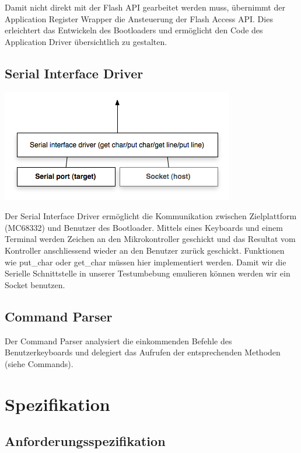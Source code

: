 \documentclass[letterpaper,10pt,ngerman]{manual}
\begin{document}
Damit nicht direkt mit der Flash API gearbeitet werden muss, übernimmt der
Application Register Wrapper die Ansteuerung der Flash Access API. Dies
erleichtert das Entwickeln des Bootloaders und ermöglicht den Code des
Application Driver übersichtlich zu gestalten.


\section{Serial Interface Driver}

\includegraphics{serial-driver.png}

Der Serial Interface Driver ermöglicht die Kommunikation zwischen Zielplattform (MC68332)
und Benutzer des Bootloader. Mittels eines Keyboards und einem Terminal werden
Zeichen an den Mikrokontroller geschickt und das Resultat vom Kontroller
anschliessend wieder an den Benutzer zurück geschickt. Funktionen wie
put\_char oder get\_char müssen hier implementiert werden.
Damit wir die Serielle Schnittstelle in unserer Testumbebung emulieren können werden wir ein Socket benutzen.


\section{Command Parser}

Der Command Parser analysiert die einkommenden Befehle des Benutzerkeyboards
und delegiert das Aufrufen der entsprechenden Methoden (siehe Commands).

\resetcurrentobjects
\hypertarget{--doc-specification/index}{}

\chapter{Spezifikation}

\resetcurrentobjects
\hypertarget{--doc-specification/specification}{}

\section{Anforderungsspezifikation}
\end{document}

